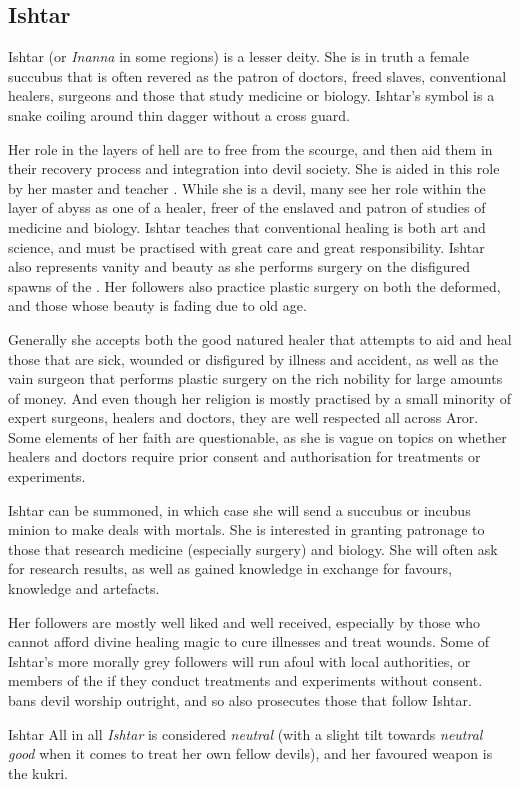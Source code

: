 \subsection{Ishtar}
\label{sec:Ishtar}

Ishtar (or \emph{Inanna} in some regions) is a lesser deity. She is in truth a
female succubus that is often revered as the patron of doctors, freed slaves,
conventional healers, surgeons and those that study medicine or biology.
Ishtar's symbol is a snake coiling around thin dagger without a cross guard.

Her role in the layers of hell are to free  from the
scourge, and then aid them in their recovery process and integration into
devil society. She is aided in this role by her master and teacher
. While she is a devil, many see her role within the
layer of abyss as one of a healer, freer of the enslaved and patron of studies
of medicine and biology. Ishtar teaches that conventional healing is both art
and science, and must be practised with great care and great
responsibility. Ishtar also represents vanity and beauty as she performs
surgery on the disfigured spawns of the . Her followers
also practice plastic surgery on both the deformed, and those whose beauty is
fading due to old age.

Generally she accepts both the good natured healer that attempts to aid and
heal those that are sick, wounded or disfigured by illness and accident, as
well as the vain surgeon that performs plastic surgery on the rich nobility
for large amounts of money. And even though her religion is mostly practised
by a small minority of expert surgeons, healers and doctors, they are well
respected all across Aror. Some elements of her faith are questionable, as she
is vague on topics on whether healers and doctors require prior consent and
authorisation for treatments or experiments.

Ishtar can be summoned, in which case she will send a succubus or incubus
minion to make deals with mortals. She is interested in granting patronage to
those that research medicine (especially surgery) and biology. She will often
ask for research results, as well as gained knowledge in exchange for favours,
knowledge and artefacts.

Her followers are mostly well liked and well received, especially by those who
cannot afford divine healing magic to cure illnesses and treat wounds. Some of
Ishtar's more morally grey followers will run afoul with local authorities, or
members of the  if they conduct treatments and experiments
without consent.  bans devil worship outright, and so also
prosecutes those that follow Ishtar.

\begin{35e}{Ishtar}
  All in all \emph{Ishtar} is considered \emph{neutral} (with a slight tilt
  towards \emph{neutral good} when it comes to treat her own fellow devils),
  and her favoured weapon is the kukri.
\end{35e}
